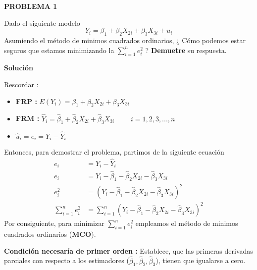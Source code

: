 \documentclass[10pt,a4paper, openany ]{book}
\begin{document}
  \pagecolor{pagecolor}
  \color{verdeclaro}
  \newpage
  \Large
  \begin{center}
      \textbf{PROBLEMA 1}
  \end{center}

  \noindent  Dado el siguiente modelo
  \vspace{0.5cm}
  \begin{equation*}
  Y_{i} = \beta_{1} + \beta_{2}X_{2i}+\beta_{3}X_{3i}+u_{i} 
  \end{equation*}
  \justifying
  Asumiendo el método de minimos cuadrados ordinarios, ¿ Cómo podemos estar seguros que estamos minimizando la $\sum\limits_{i = 1}^{n}e^{2}_{i}$ ? \textbf{Demuetre}  su respuesta. \\
  \begin{center}
      \textbf{Solución} 
  \end{center}
  Rescordar : 
  \begin{itemize}
      \item     \textbf{FRP :}  $ E\left(Y_{i}\right)  =  \beta_{1} + \beta_{2}X_{2i}+\beta_{3}X_{3i} $ 
      \item \textbf{FRM :}  $ \hat{Y}_{i}  =  \hat{\beta}_{1} + \hat{\beta}_{2}X_{2i}+\hat{\beta}_{3}X_{3i} $ \, \, \, \,  $ i =1,2,3,...,n $
      \item $ \hat{u}_{i} = e_{i} = Y_{i}-\hat{Y}_{i}$
  \end{itemize} 
  Entonces, para demostrar el problema, partimos de la siguiente ecuación\\ 
  \begin{align*}
        e_{i} &= Y_{i} - \hat{Y}_{i}\\
            e_{i} &= Y_{i} - \hat{\beta}_{1}-\hat{\beta}_{2}X_{2i}-\hat{\beta}_{3}X_{3i}\\
              e^{2}_{i} &= ( Y_{i} - \hat{\beta}_{1}-\hat{\beta}_{2}X_{2i}-\hat{\beta}_{3}X_{3i} )^{2}\\
              \sum\limits_{i=1}^{n}e^{2}_{i} &= \sum\limits_{i=1}^{n} ( Y_{i} - \hat{\beta}_{1}-\hat{\beta}_{2}X_{2i}-\hat{\beta}_{3}X_{3i} )^{2} 
  \end{align*}
  \justifying
  Por consiguiente, para minimizar $ \sum\limits_{i=1}^{n}e^{2}_{i} $ empleamos el método de minimos cuadrados ordinarios (\textbf{MCO}). 
  \begin{center}
  \justifying
  \textbf{Condición necesaría de primer orden :} Establece, que las primeras derivadas parciales con respecto a los estimadores ($\hat{\beta}_{1},\hat{\beta}_{2},\hat{\beta}_{3}$), tienen que igualarse a cero.    
  \end{center}
\end{document}
